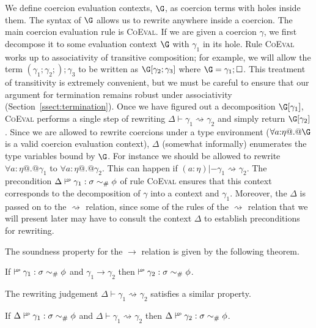 \documentclass[a4paper,UKenglish]{lipics}
\def\fiddle#1{\hspace*{-0.8ex}\raisebox{0.1ex}{$\scriptscriptstyle#1$}}
\def\rulename#1{\textsc{#1}}
\newcommand{\wfco}{\vdash^{\fiddle{\sf{co}}}}
\newcommand{\psim}{\mathrel{\sim_{\tiny \#}}}
\def\rulename#1{\textsc{#1}}
\newcommand{\rsa}[1]{\rightsquigarrow_{#1}}
\begin{document}
We define coercion evaluation contexts, $\G$, as coercion terms with holes inside them. The syntax of $\G$ allows us to rewrite anywhere 
inside a coercion. The main coercion evaluation rule is \rulename{CoEval}. If we are given a coercion $\gamma$, we first decompose it to some 
evaluation context $\G$ with $\gamma_1$ in its hole. Rule \rulename{CoEval} works up to associativity of transitive composition;
for example, we will 
allow the term $(\gamma_1;\gamma_2;);\gamma_3$ to be written as $\G[\gamma_2;\gamma_3]$ where $\G = \gamma_1;\Box$. This treatment of 
transitivity is extremely convenient, but we must be careful to ensure that our argument for termination 
remains robust under associativity (Section~\ref{ssect:termination}). Once we
have figured out a decomposition $\G[\gamma_1]$, \rulename{CoEval} performs 
a single step of rewriting $\Delta \vdash \gamma_1 \rsa{} \gamma_2$ and simply return $\G[\gamma_2]$. 
Since we are allowed to rewrite coercions under a type environment ($\forall a{:}\eta @.@ \G$ is a valid coercion 
evaluation context), $\Delta$ (somewhat informally) enumerates the type variables bound by $\G$. For instance we
should be allowed to rewrite $\forall a{:}\eta @.@ \gamma_1$ to $\forall a{:}\eta @.@ \gamma_2$. This can happen 
if $(a{:}\eta) |- \gamma_1 \rsa{} \gamma_2$. The precondition $\Delta \wfco \gamma_1 : \sigma \psim \phi$ of rule
\rulename{CoEval} ensures that this context corresponds to the decomposition of $\gamma$ into a context and $\gamma_1$.
Moreover, the $\Delta$ is passed on to the $\rsa{}$ relation, since some of the rules of the $\rsa{}$ relation that we will present 
later may have to consult the context $\Delta$ to establish preconditions for rewriting.

The soundness property for the $\longrightarrow$ relation is given by the following theorem.
\begin{theorem}\label{thm:sr-theorem}
If $\wfco \gamma_1 : \sigma \psim \phi$ and $\gamma_1 \longrightarrow \gamma_2$ then $\wfco \gamma_2 : \sigma \psim \phi$. 
\end{theorem}
The rewriting judgement $\Delta \vdash \gamma_1 \rsa{} \gamma_2$ satisfies a similar property. 
\begin{lemma}\label{lem:sr-lemma}
If $\Delta \wfco \gamma_1 : \sigma \psim \phi$ and $\Delta \vdash \gamma_1 \rsa{} \gamma_2$ then $\Delta \wfco \gamma_2 : \sigma \psim \phi$. 
\end{lemma}
\end{document}
